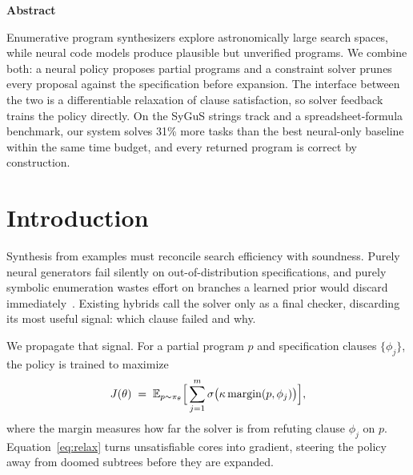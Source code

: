 \documentclass[10pt,twocolumn]{article}
\begin{document}
\thispagestyle{empty}

\begin{center}{\bfseries Abstract}\end{center}
\noindent Enumerative program synthesizers explore astronomically large
search spaces, while neural code models produce plausible but unverified
programs. We combine both: a neural policy proposes partial programs and a
constraint solver prunes every proposal against the specification before
expansion. The interface between the two is a differentiable relaxation of
clause satisfaction, so solver feedback trains the policy directly. On the
SyGuS strings track and a spreadsheet-formula benchmark, our system solves
31\% more tasks than the best neural-only baseline within the same time
budget, and every returned program is correct by construction.

\section{Introduction}
Synthesis from examples must reconcile search efficiency with soundness.
Purely neural generators fail silently on out-of-distribution
specifications, and purely symbolic enumeration wastes effort on branches a
learned prior would discard immediately~\cite{halvorsen2023enum}. Existing
hybrids call the solver only as a final checker, discarding its most useful
signal: which clause failed and why.

We propagate that signal. For a partial program $p$ and specification
clauses $\{\phi_j\}$, the policy is trained to maximize
\begin{equation}
  J(\theta) \;=\; \mathbb{E}_{p \sim \pi_{\theta}}
  \Bigl[\, \sum_{j=1}^{m} \sigma\bigl(\kappa\, \mathrm{margin}(p, \phi_j)\bigr) \Bigr],
  \label{eq:relax}
\end{equation}
where the margin measures how far the solver is from refuting clause
$\phi_j$ on $p$. Equation~\eqref{eq:relax} turns unsatisfiable cores into
gradient, steering the policy away from doomed subtrees before they are
expanded.
\end{document}
